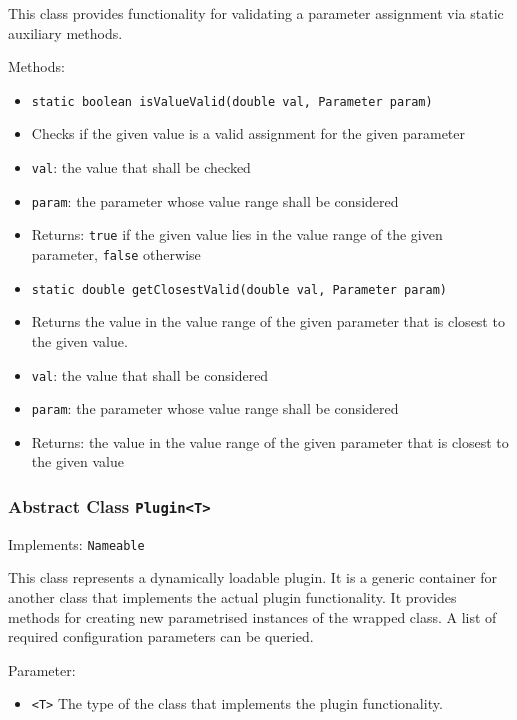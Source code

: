 \documentclass[parskip=full,11pt]{scrartcl}
\begin{document}
This class provides functionality for validating a parameter assignment via static auxiliary methods.

Methods:

\begin{itemize} \itemsep -10pt
	\item \texttt{static boolean isValueValid(double val, Parameter param)}
	\item[] Checks if the given value is a valid assignment for the given parameter
	\item[] \texttt{val}: the value that shall be checked
	\item[] \texttt{param}: the parameter whose value range shall be considered
	\item[] Returns: \texttt{true} if the given value lies in the value range of the given parameter, \texttt{false} otherwise
	\item \texttt{static double getClosestValid(double val, Parameter param)}
	\item[] Returns the value in the value range of the given parameter that is closest to the given value.
	\item[] \texttt{val}: the value that shall be considered
	\item[] \texttt{param}: the parameter whose value range shall be considered
	\item[] Returns: the value in the value range of the given parameter that is closest to the given value
\end{itemize}

\subsubsection{Abstract Class \texttt{Plugin<T>}}
Implements: \texttt{Nameable}

This class represents a dynamically loadable plugin. It is a generic container for another class that implements the actual plugin functionality. It provides methods for creating new parametrised instances of the wrapped class. A list of required configuration parameters can be queried.

Parameter:
\begin{itemize}\itemsep -10pt
	\item \texttt{<T>} The type of the class that implements the plugin functionality.
\end{itemize}
\end{document}
